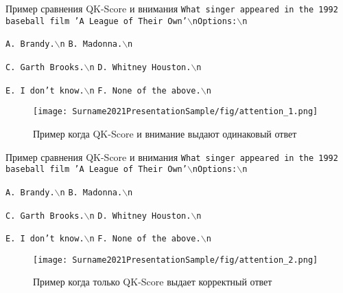 \documentclass{beamer}
\begin{document}
\begin{frame}{Пример сравнения QK-Score и внимания}
    \texttt{What singer appeared in the 1992 baseball film 'A League of Their Own'$\backslash$nOptions:$\backslash$n}
    
    \texttt{A. Brandy.$\backslash$n}
    \texttt{B. Madonna.$\backslash$n}
    
    \texttt{C. Garth Brooks.$\backslash$n}
    \texttt{D. Whitney Houston.$\backslash$n}

    
    \texttt{E. I don't know.$\backslash$n}
    \texttt{F. None of the above.$\backslash$n}
    \begin{figure}
                \centering
                \texttt{[image: Surname2021PresentationSample/fig/attention\_1.png]} 
                \caption{Пример когда QK-Score и внимание выдают одинаковый ответ}
    \end{figure}
\end{frame}

\begin{frame}{Пример сравнения QK-Score и внимания}
     \texttt{What singer appeared in the 1992 baseball film 'A League of Their Own'$\backslash$nOptions:$\backslash$n}
    
    \texttt{A. Brandy.$\backslash$n}
    \texttt{B. Madonna.$\backslash$n}
    
    \texttt{C. Garth Brooks.$\backslash$n}
    \texttt{D. Whitney Houston.$\backslash$n}

    
    \texttt{E. I don't know.$\backslash$n}
    \texttt{F. None of the above.$\backslash$n}
    \begin{figure}
                \centering
                \texttt{[image: Surname2021PresentationSample/fig/attention\_2.png]} 
                \caption{Пример когда только QK-Score выдает корректный ответ}
    \end{figure}
\end{frame}
\end{document}
